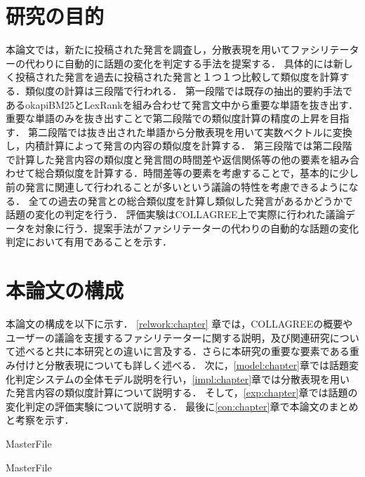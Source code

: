 \section{研究の目的}
\label{intro:taget}
本論文では，新たに投稿された発言を調査し，分散表現を用いてファシリテーターの代わりに自動的に話題の変化を判定する手法を提案する．
具体的には新しく投稿された発言を過去に投稿された発言と１つ１つ比較して類似度を計算する．類似度の計算は三段階で行われる．
第一段階では既存の抽出的要約手法であるokapiBM25とLexRankを組み合わせて発言文中から重要な単語を抜き出す．重要な単語のみを抜き出すことで第二段階での類似度計算の精度の上昇を目指す．
第二段階では抜き出された単語から分散表現を用いて実数ベクトルに変換し，内積計算によって発言の内容の類似度を計算する．
第三段階では第二段階で計算した発言内容の類似度と発言間の時間差や返信関係等の他の要素を組み合わせて総合類似度を計算する．時間差等の要素を考慮することで，基本的に少し前の発言に関連して行われることが多いという議論の特性を考慮できるようになる．
全ての過去の発言との総合類似度を計算し類似した発言があるかどうかで話題の変化の判定を行う．
評価実験はCOLLAGREE上で実際に行われた議論データを対象に行う．提案手法がファシリテーターの代わりの自動的な話題の変化判定において有用であることを示す．

\section{本論文の構成}
本論文の構成を以下に示す．
\ref{relwork:chapter} 章では，COLLAGREEの概要やユーザーの議論を支援するファシリテーターに関する説明，及び関連研究について述べると共に本研究との違いに言及する．さらに本研究の重要な要素である重み付けと分散表現についても詳しく述べる．
次に，\ref{model:chapter}章では話題変化判定システムの全体モデル説明を行い，\ref{impl:chapter}章では分散表現を用いた発言内容の類似度計算について説明する．
そして，\ref{exp:chapter}章では話題の変化判定の評価実験について説明する．
最後に\ref{con:chapter}章で本論文のまとめと考察を示す．


 \expandafter\ifx\csname MasterFile\endcsname\relax
	\def\BibFile{hoge}
	
  \fi
  \expandafter\ifx\csname MasterFile\endcsname\relax
  
  \fi

